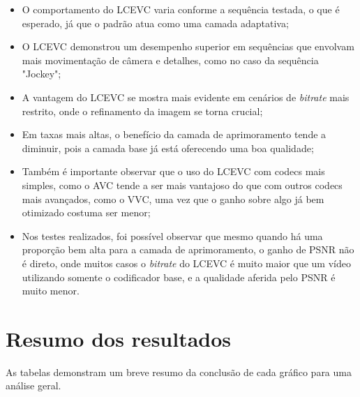 \begin{itemize}
    \item O comportamento do \acrshort{LCEVC} varia conforme a sequência testada, o
    que é esperado, já que o padrão atua como uma camada adaptativa;

    \item O \acrshort{LCEVC} demonstrou um desempenho superior em sequências que
    envolvam mais movimentação de câmera e detalhes, como no caso da sequência "Jockey";
    
    \item A vantagem do \acrshort{LCEVC}  se mostra mais evidente em cenários de
    \textit{bitrate} mais restrito, onde o refinamento da imagem se torna crucial;


    \item Em taxas mais altas, o benefício da camada de aprimoramento tende a diminuir,
    pois a camada base já está oferecendo uma boa qualidade;

    \item Também é importante observar que o uso do \acrshort{LCEVC} com codecs mais
    simples, como o \acrshort{AVC} tende a ser mais vantajoso do que com outros codecs
    mais avançados, como o \acrshort{VVC}, uma vez que o ganho sobre algo já bem
    otimizado costuma ser menor;

    \item Nos testes realizados, foi possível observar que mesmo quando há uma proporção
    bem alta para a camada de aprimoramento, o ganho de \acrshort{PSNR} não é direto, onde
    muitos casos o \textit{bitrate} do \acrshort{LCEVC} é muito maior que um vídeo utilizando
    somente o codificador base, e a qualidade aferida pelo \acrshort{PSNR} é muito menor.
\end{itemize}

\newpage
\section{Resumo dos resultados}

As tabelas demonstram um breve resumo da conclusão de cada gráfico para uma análise 
geral.

